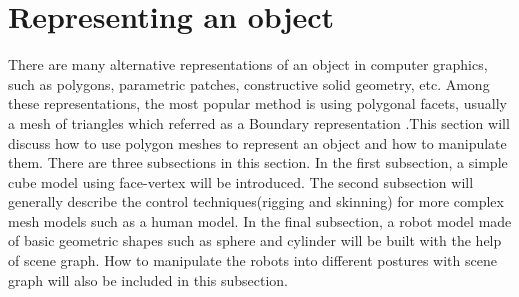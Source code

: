 \section{Representing an object} 
There are many alternative representations of an object in computer graphics, such as polygons, parametric patches, constructive solid geometry, etc. Among these representations, the most popular method is using polygonal facets, usually a mesh of triangles which referred as a Boundary representation \cite{alan3D}.This section will discuss how to use polygon meshes to represent an object and how to manipulate them. There are three subsections in this section. In the first subsection, a simple cube model using face-vertex will be introduced. The second subsection will generally describe the control techniques(rigging and skinning) for more complex mesh models such as a human model. In the final subsection, a robot model made of basic geometric shapes such as sphere and cylinder will be built with the help of scene graph. How to manipulate the robots into different postures with scene graph will also be included in this subsection. 



